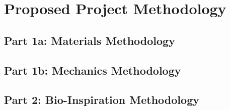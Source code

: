 \documentclass[10pt]{article}
\begin{document}
\section*{Proposed Project Methodology} %

\subsection*{Part 1a: Materials Methodology}
\lipsum[1]

\subsection*{Part 1b: Mechanics Methodology}



\lipsum[1]

\subsection*{Part 2: Bio-Inspiration Methodology}
\lipsum[1]

\vspace{-12pt}
\small 
\newpage
\end{document}
